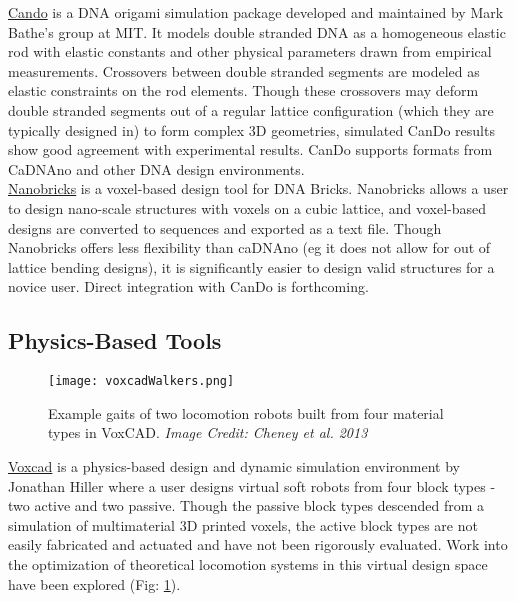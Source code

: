 {\href{http://cando-dna-origami.org/}{Cando} is a DNA origami simulation package developed and maintained by Mark Bathe's group at MIT.  It models double stranded DNA as a homogeneous elastic rod with elastic constants and other physical parameters drawn from empirical measurements\cite{Peters2014}.  Crossovers between double stranded segments are modeled as elastic constraints on the rod elements.  Though these crossovers may deform double stranded segments out of a regular lattice configuration (which they are typically designed in) to form complex 3D geometries, simulated CanDo results show good agreement with experimental results\cite{Kim2012a}.  CanDo supports formats from CaDNAno and other DNA design environments.
\\

\href{http://yin.hms.harvard.edu/bricks/try/}{Nanobricks} is a voxel-based design tool for DNA Bricks.  Nanobricks allows a user to design nano-scale structures with voxels on a cubic lattice, and voxel-based designs are converted to sequences and exported as a text file.  Though Nanobricks offers less flexibility than caDNAno (eg it does not allow for out of lattice bending designs), it is significantly easier to design valid structures for a novice user.  Direct integration with CanDo is forthcoming.
\\

\subsection{Physics-Based Tools}

\begin{figure}
  \texttt{[image: voxcadWalkers.png]}
  \caption{Example gaits of two locomotion robots built from four material types in VoxCAD\cite{Cheney2013b}.  \textit{Image Credit: Cheney et al. 2013}}
  \label{fig:voxcadWalkers}
\end{figure}

\href{http://www.voxcad.com/}{Voxcad} is a physics-based design and dynamic simulation environment by Jonathan Hiller where a user designs virtual soft robots from four block types - two active and two passive\cite{Hiller2014a}.  Though the passive block types descended from a simulation of multimaterial 3D printed voxels, the active block types are not easily fabricated and actuated\cite{Hiller2012} and have not been rigorously evaluated.  Work into the optimization of theoretical locomotion systems in this virtual design space have been explored (Fig: \ref{fig:voxcadWalkers})\cite{Cheney2013b}\cite{Cheney2013}\cite{Cheney2015}.
\\

}
